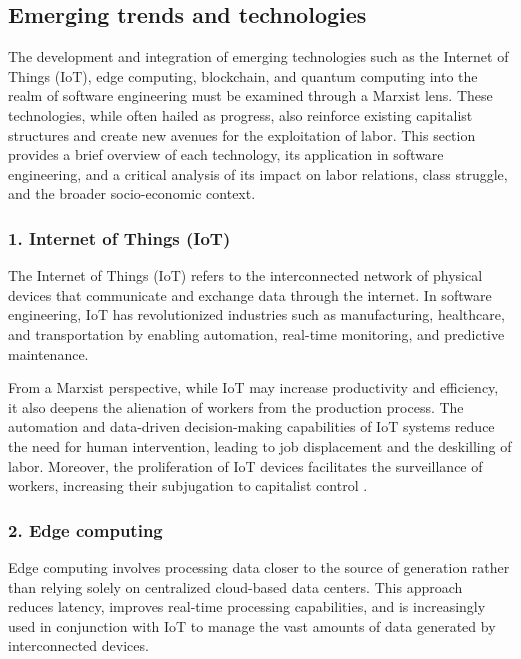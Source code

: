 \begin{refsection}
\begin{multicols}{2}
{}
\subsection{Emerging trends and technologies}
{\small
The development and integration of emerging technologies such as the Internet of Things (IoT), edge computing, blockchain, and quantum computing into the realm of software engineering must be examined through a Marxist lens. These technologies, while often hailed as progress, also reinforce existing capitalist structures and create new avenues for the exploitation of labor. This section provides a brief overview of each technology, its application in software engineering, and a critical analysis of its impact on labor relations, class struggle, and the broader socio-economic context.

\subsubsection*{1. Internet of Things (IoT)}

The Internet of Things (IoT) refers to the interconnected network of physical devices that communicate and exchange data through the internet. In software engineering, IoT has revolutionized industries such as manufacturing, healthcare, and transportation by enabling automation, real-time monitoring, and predictive maintenance.

From a Marxist perspective, while IoT may increase productivity and efficiency, it also deepens the alienation of workers from the production process. The automation and data-driven decision-making capabilities of IoT systems reduce the need for human intervention, leading to job displacement and the deskilling of labor. Moreover, the proliferation of IoT devices facilitates the surveillance of workers, increasing their subjugation to capitalist control \cite{smith2020iot,harvey2007limits}.

\subsubsection*{2. Edge computing}

Edge computing involves processing data closer to the source of generation rather than relying solely on centralized cloud-based data centers. This approach reduces latency, improves real-time processing capabilities, and is increasingly used in conjunction with IoT to manage the vast amounts of data generated by interconnected devices.

}
\end{multicols}
\end{refsection}

